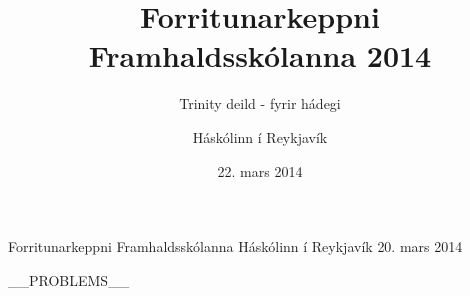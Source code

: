 \documentclass[11pt,a4paper,oneside]{article}
\title{Forritunarkeppni Framhaldsskólanna 2014}
\subtitle{Trinity deild - fyrir hádegi}
\date{22. mars 2014}
\author{Háskólinn í Reykjavík}
\newcommand{\problemstatement}[1]{  }
\begin{document}

	\maketitle
	\thispagestyle{empty}
	\pagebreak

	\contest
	{Forritunarkeppni Framhaldsskólanna}%
	{Háskólinn í Reykjavík}%
	{20. mars 2014}%

    __PROBLEMS__

\end{document}
